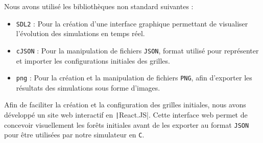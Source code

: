\documentclass[12pt]{article}
\begin{document}
Nous avons utilisé les bibliothèques non standard suivantes :

\begin{itemize}
    \item \texttt{SDL2} : Pour la création d'une interface graphique permettant de visualiser l'évolution des simulations en temps réel.
    \item \texttt{cJSON} : Pour la manipulation de fichiers \texttt{JSON}, format utilisé pour représenter et importer les configurations initiales des grilles.
    \item \texttt{png} : Pour la création et la manipulation de fichiers \texttt{PNG}, afin d'exporter les résultats des simulations sous forme d'images.
\end{itemize}

Afin de faciliter la création et la configuration des grilles initiales, nous avons développé un site web interactif en \texttt|React.JS|. Cette interface web permet de concevoir visuellement les forêts initiales avant de les exporter au format \texttt{JSON} pour être utilisées par notre simulateur en \texttt{C}.
\end{document}
